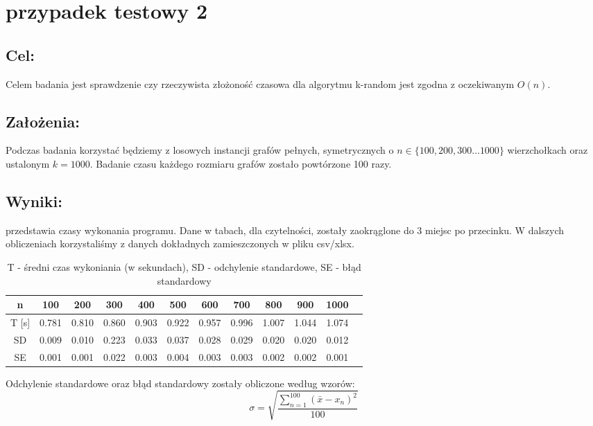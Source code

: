 \section{przypadek testowy 2}
\subsection{Cel: }
Celem badania jest sprawdzenie czy rzeczywista złożoność czasowa dla algorytmu k-random jest zgodna z oczekiwanym \(O(n)\).
\subsection{Założenia: }
Podczas badania korzystać będziemy z losowych instancji grafów pełnych, symetrycznych o \(n \in \{ 100, 200, 300 \ldots 1000 \}\) wierzchołkach oraz ustalonym \( k = 1000 \). Badanie czasu każdego rozmiaru grafów zostało powtórzone 100 razy.

\subsection{Wyniki: }
 przedstawia czasy wykonania programu. Dane w tabach, dla czytelności, zostały zaokrąglone do 3 miejsc po przecinku. W dalszych obliczeniach korzystaliśmy z danych dokładnych zamieszczonych w pliku csv/xlsx.
\begin{table}[!ht]
  \centering
  \begin{tabular}{|c|c|c|c|c|c|c|c|c|c|c| p{10cm} }
  \hline
      n & 100 & 200 & 300 & 400 & 500 & 600 & 700 & 800 & 900 & 1000 \\ \hline \hline
      T [s] & 0.781 & 0.810 & 0.860 & 0.903 & 0.922 & 0.957 & 0.996 & 1.007 & 1.044 & 1.074 \\ \hline
      SD & 0.009 & 0.010 & 0.223 & 0.033 & 0.037 & 0.028 & 0.029 & 0.020 & 0.020 & 0.012 \\ \hline
      SE & 0.001 & 0.001 & 0.022 & 0.003 & 0.004 & 0.003 & 0.003 & 0.002 & 0.002 & 0.001 \\ \hline
  \end{tabular}
  \caption{T - średni czas wykoniania (w sekundach), SD - odchylenie standardowe, SE - błąd standardowy}
\end{table}

Odchylenie standardowe oraz błąd standardowy zostały obliczone według wzorów: \\
\begin{equation} \label{eq:1}
  \sigma = \sqrt{\frac{\sum_{n = 1}^{100}(\bar{x} - x_n)^2}{100}}
\end{equation}
  
